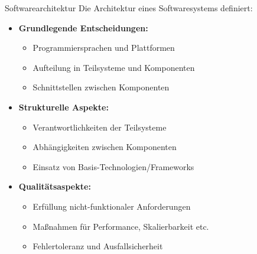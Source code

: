 \begin{definition}{Softwarearchitektur}
Die Architektur eines Softwaresystems definiert:

\begin{itemize}
    \item \textbf{Grundlegende Entscheidungen:}
    \begin{itemize}
        \item Programmiersprachen und Plattformen
        \item Aufteilung in Teilsysteme und Komponenten
        \item Schnittstellen zwischen Komponenten
    \end{itemize}
    
    \item \textbf{Strukturelle Aspekte:}
    \begin{itemize}
        \item Verantwortlichkeiten der Teilsysteme
        \item Abhängigkeiten zwischen Komponenten
        \item Einsatz von Basis-Technologien/Frameworks
    \end{itemize}
    
    \item \textbf{Qualitätsaspekte:}
    \begin{itemize}
        \item Erfüllung nicht-funktionaler Anforderungen
        \item Maßnahmen für Performance, Skalierbarkeit etc.
        \item Fehlertoleranz und Ausfallsicherheit
    \end{itemize}
\end{itemize}
\end{definition}

